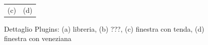 \begin{figure}[htbp]
\begin{center}
\begin{tabular}{c @{\hspace{1em}} c}
 (c) & (d) \\
\end{tabular}
\end{center}
\caption{Dettaglio Plugins: (a) libreria, (b) ???, (c) finestra con tenda, (d) finestra con veneziana}\label{fig:figura4}
\end{figure}

\newpage
